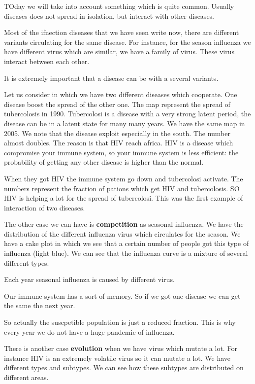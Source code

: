 \documentclass[../main/main.tex]{subfiles}
\begin{document}


TOday we will take into account something which is quite common. Usually diseases does not spread in isolation, but interact with other diseases.

Most of the ifnection diseases that we have seen write now, there are different variants circulating for the same disease. For instance, for the season influenza we have different virus which are similar, we have a family of virus. These virus interact between each other.

It is extremely important that a disease can be with a several variants.


Let us consider in which we have two different diseases which cooperate. One disease boost the spread of the other one. The map represent the spread of tubercolosis in 1990. Tubercolosi is a disease with a very strong latent period, the disease can be in a latent state for many many years. We have the same map in 2005. We note that the disease exploit especially in the south.
The number almost doubles. The reason is that HIV reach africa. HIV is a disease which compromise your immune system, so your immune system is less efficient: the probability of getting any other disease is higher than the normal.

When they got HIV the immune system go down and tubercolosi activate. The numbers represent the fraction of pations which get HIV and tubercolosis. SO HIV is helping a lot for the spread of tubercolosi.
This was the first example of interaction of two diseases.


The other case we can have is \textbf{competition} as seasonal influenza. We have the distribution of the different influenza virus which circulates for the season. We have a cake plot in which we see that a certain number of people got this type of influenza (light blue). We can see that the influenza curve is a mixture of several different types.

Each year seasonal influenza is caused by different virus.

Our immune system has a sort of memory. So if we got one disease we can get the same the next year.

So actually the suscpetible population is just a reduced fraction. This is why every year we do not have a huge pandemic of influenza.

There is another case \textbf{evolution} when we have virus which mutate a lot.
For instance HIV is an extremely volatile virus so it can mutate a lot. We have different types and subtypes. We can see how these subtypes are distributed on different areas.
\end{document}
